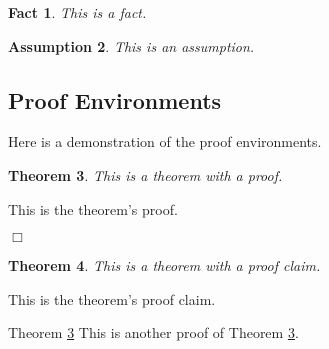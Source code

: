 \documentclass{article}
\newtheorem{theorem}{Theorem}
\newtheorem{fact}[theorem]{Fact}
\newtheorem{assumption}[theorem]{Assumption}
\newenvironment{proof}{\noindent{\bf Proof:} \hspace*{1mm}}{
	\hspace*{\fill} $\Box$ }
\newenvironment{proof_of}[1]{\noindent {\bf Proof of #1:}
	\hspace*{1mm}}{\hspace*{\fill} $\Box$ }
\newenvironment{proof_claim}{\begin{quotation} \noindent}{
	\hspace*{\fill} $\diamond$ \end{quotation}}
\begin{document}
\begin{fact}
This is a fact.
\end{fact}

\begin{assumption}
This is an assumption.
\end{assumption}

\subsection{Proof Environments}

Here is a demonstration of the proof environments.

\begin{theorem}
\label{thm:thm-label}
This is a theorem with a proof.
\end{theorem}

\begin{proof}
This is the theorem's proof.
\end{proof}

\begin{theorem}
This is a theorem with a proof claim.
\end{theorem}

\begin{proof_claim}
This is the theorem's proof claim.
\end{proof_claim}

\begin{proof_of}{Theorem \ref{thm:thm-label}}
This is another proof of Theorem \ref{thm:thm-label}.
\end{proof_of}



%
%
%
\end{document}
